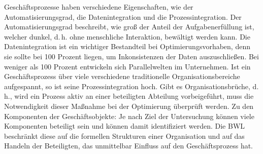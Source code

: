Geschäftsprozesse haben verschiedene Eigenschaften, wie der Automatisierungsgrad, die Datenintegration und die Prozessintegration. Der Automatisierungsgrad beschreibt, wie groß der Anteil der Aufgabenerfüllung ist, welcher dunkel, d.\,h. ohne menschliche Interaktion, bewältigt werden kann. Die Datenintegration ist ein wichtiger Bestandteil bei Optimierungsvorhaben, denn sie sollte bei 100 Prozent liegen, um Inkonsistenzen der Daten auszuschließen. Bei weniger als 100 Prozent entwickeln sich Parallelwelten im Unternehmen. Ist ein Geschäftsprozess über viele verschiedene traditionelle Organisationsbereiche aufgespannt, so ist seine Prozessintegration hoch. Gibt es Organisationsbrüche, d.\,h., wird ein Prozess aktiv an einer beteiligten Abteilung vorbeigeführt, muss die Notwendigkeit dieser Maßnahme bei der Optimierung überprüft werden. Zu den Komponenten der Geschäftsobjekte: Je nach Ziel der Untersuchung können viele Komponenten beteiligt sein und können damit identifiziert werden. Die \ac{BWL} beschränkt diese auf die formellen Strukturen einer Organisation und auf das Handeln der Beteiligten, das unmittelbar Einfluss auf den Geschäftsprozess hat.\autocite[vgl.][S.\,15]{staud_geschaftsprozessanalyse_2006} \par

